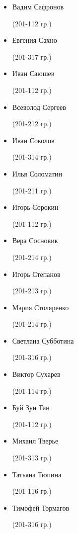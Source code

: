 \begin{multicols}{2}
\begin{small}
\begin{itemize}[leftmargin=*]
	\item[] Вадим Сафронов\begin{tiny} (201-112 гр.)\end{tiny}
	\item[] Евгения Сахно\begin{tiny} (201-317 гр.)\end{tiny} %
	\item[] Иван Саюшев\begin{tiny} (201-112 гр.)\end{tiny}
	\item[] Всеволод Сергеев\begin{tiny} (201-212 гр.)\end{tiny}
	\item[] Иван Соколов\begin{tiny} (201-314 гр.)\end{tiny} %
	\item[] Илья Соломатин\begin{tiny} (201-211 гр.)\end{tiny}
	\item[] Игорь Сорокин\begin{tiny} (201-112 гр.)\end{tiny}
	\item[] Вера Сосновик\begin{tiny} (201-214 гр.)\end{tiny}
	\item[] Игорь Степанов\begin{tiny} (201-213 гр.)\end{tiny}
	\item[] Мария Столяренко\begin{tiny} (201-214 гр.)\end{tiny}
	\item[] Светлана Субботина\begin{tiny} (201-316 гр.)\end{tiny} %
	\item[] Виктор Сухарев\begin{tiny} (201-114 гр.)\end{tiny} %

	\item[] Буй Зуи Тан\begin{tiny} (201-112 гр.)\end{tiny}
	\item[] Михаил Тверье\begin{tiny} (201-313 гр.)\end{tiny} %
	\item[] Татьяна Тюпина\begin{tiny} (201-116 гр.)\end{tiny}
	\item[] Тимофей Тормагов\begin{tiny} (201-316 гр.)\end{tiny} %


\end{itemize}
\end{small}
\end{multicols}
